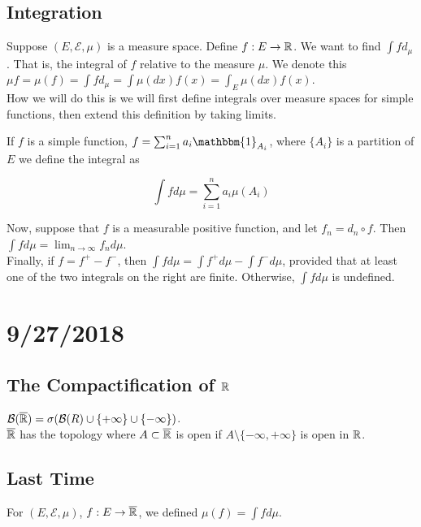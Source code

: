 \documentclass[english, course]{Notes}
\begin{document}
\subsection{Integration}

Suppose $(E, \mathcal{E}, \mu)$ is a measure space. Define $f: E \to \mathbb{R}$. We want to find $\int f d_\mu$. That is, the integral of $f$ relative to the measure $\mu$. We denote this $\mu f = \mu(f) = \int f d_\mu = \int \mu(dx)f(x) = \int_E \mu(dx) f(x)$.\\

How we will do this is we will first define integrals over measure spaces for simple functions, then extend this definition by taking limits.\\

\begin{definition}
If $f$ is a simple function, $f = \sum_{i = 1}^n a_i \mathbbm{1}_{A_i}$, where $\{A_i\}$ is a partition of $E$ we define the integral as

\[\int f d\mu = \sum_{i=1}^n a_i \mu(A_i)\]

Now, suppose that $f$ is a measurable positive function, and let $f_n = d_n \circ f$. Then $\int f d\mu = \lim_{n \to \infty} f_n d\mu$.\\

Finally, if $f = f^+ - f^-$, then $\int f d\mu = \int f^+ d\mu - \int f^- d\mu$, provided that at least one of the two integrals on the right are finite. Otherwise, $\int f d\mu$ is undefined.
\end{definition}

\section{9/27/2018}

\subsection{The Compactification of $\mathbb{R}$}

$\mathcal{B}(\overline{\mathbb{R}}) = \sigma(\mathcal{B}(R) \cup \{+ \infty\} \cup \{-\infty\})$.\\

$\overline{\mathbb{R}}$ has the topology where $A \subset \overline{\mathbb{R}}$ is open if $A \setminus \{-\infty, +\infty\}$ is open in $\mathbb{R}$.\\

\subsection{Last Time}
For $(E, \mathcal{E}, \mu)$, $f: E \to \overline{\mathbb{R}}$, we defined $\mu(f) = \int f d\mu$.
\end{document}
